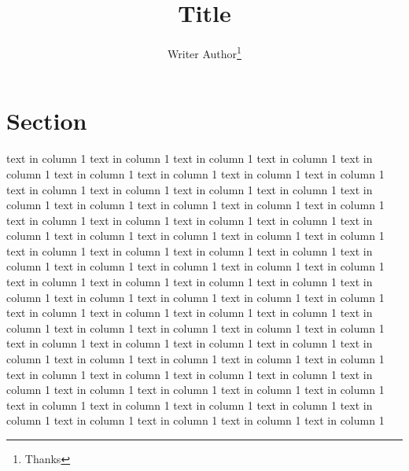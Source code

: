 \documentclass{article}
\title{Title}
\author{Writer Author\thanks{Thanks}}
\begin{document}
\sloppy%

\maketitle

%
\section{Section}
 text in column 1  text in column 1  text in column 1  text in column 1  text in column 1  text in column 1  text in column 1  text in column 1  text in column 1  text in column 1  text in column 1  text in column 1  text in column 1  text in column 1  text in column 1  text in column 1  text in column 1  text in column 1  text in column 1  text in column 1  text in column 1  text in column 1  text in column 1  text in column 1  text in column 1  text in column 1  text in column 1  text in column 1  text in column 1  text in column 1  text in column 1  text in column 1  text in column 1  text in column 1  text in column 1  text in column 1  text in column 1  text in column 1  text in column 1  text in column 1  text in column 1  text in column 1  text in column 1  text in column 1  text in column 1  text in column 1  text in column 1  text in column 1  text in column 1  text in column 1  text in column 1  text in column 1  text in column 1  text in column 1  text in column 1  text in column 1  text in column 1  text in column 1  text in column 1  text in column 1  text in column 1  text in column 1  text in column 1  text in column 1  text in column 1  text in column 1  text in column 1  text in column 1  text in column 1  text in column 1  text in column 1  text in column 1  text in column 1  text in column 1  text in column 1  text in column 1  text in column 1  text in column 1  text in column 1  text in column 1
 text in column 1
\end{document}
